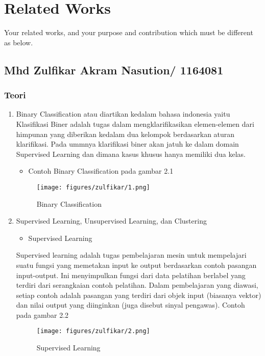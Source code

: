 \chapter{Related Works}

Your related works, and your purpose and contribution which must be different as below.

\section{Mhd Zulfikar Akram Nasution/ 1164081}
\subsection{Teori}
\begin{enumerate}
\item Binary Classification atau diartikan kedalam bahasa indonesia yaitu Klasifikasi Biner adalah tugas dalam mengklarifikasikan elemen-elemen dari himpunan yang diberikan kedalam dua kelompok berdasarkan aturan klarifikasi. Pada ummnya klarifikasi biner akan jatuh ke dalam domain Supervised Learning dan dimana kasus khusus hanya memiliki dua kelas.
\begin{itemize}
\item  Contoh Binary Classification pada gambar 2.1
\end{itemize}
\begin{figure}[ht]
\centering
\texttt{[image: figures/zulfikar/1.png]}
\caption{Binary Classification}
\end{figure}

\item Supervised Learning, Unsupervised Learning, dan Clustering
\begin{itemize}
\item Supervised Learning
\end{itemize}
\par
Supervised learning adalah tugas pembelajaran mesin untuk mempelajari suatu fungsi yang memetakan input ke output berdasarkan contoh pasangan input-output. Ini menyimpulkan fungsi dari data pelatihan berlabel yang terdiri dari serangkaian contoh pelatihan. Dalam pembelajaran yang diawasi, setiap contoh adalah pasangan yang terdiri dari objek input (biasanya vektor) dan nilai output yang diinginkan (juga disebut sinyal pengawas). Contoh pada gambar 2.2
\begin{figure}[ht]
\centering
\texttt{[image: figures/zulfikar/2.png]}
\caption{Supervised Learning}
\end{figure}


\end{enumerate}
